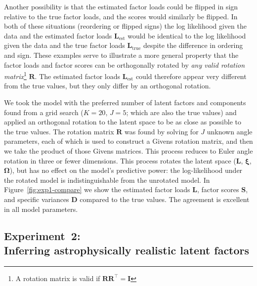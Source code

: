 \documentclass[twocolumn]{aastex62}
\newcommand{\vect}[1]{\boldsymbol{\mathbf{#1}}}
\renewcommand{\vec}[1]{\vect{#1}}
\newcommand{\transpose}{^\intercal}
\newcommand{\factorloads}{\textbf{L}}
\newcommand{\factorscores}{\textbf{S}}
\newcommand{\specificvariance}{\vec{D}}
\newcommand{\scoremeans}{\vec\xi}
\newcommand{\scorecovs}{\vec\Omega}
\newcommand{\NumLatentFactors}{J}
\newcommand{\NumComponents}{K}
\begin{document}
Another possibility is that the estimated factor loads could be flipped in sign 
relative to the true factor loads, and the scores would similarly be flipped. 
In both of these situations (reordering or flipped signs) the log likelihood 
given the data and the estimated factor loads $\factorloads_\textrm{est}$ 
would be identical to the log likelihood given the data and the true factor loads 
$\factorloads_\textrm{true}$
despite the difference in ordering and sign. These examples serve to illustrate a more 
general property that the factor loads and factor scores can be orthogonally 
rotated by \emph{any valid rotation matrix}\footnote{A rotation matrix is valid if 
$\vec{R}\vec{R}\transpose = \vec{I}$} $\vec{R}$. The estimated factor loads 
$\factorloads_\textrm{est}$ could therefore appear very different from the true 
values, but they only differ by an orthogonal rotation. 




We took the model with the preferred number of latent factors and components found
from a grid search ($\NumComponents = 20$, $\NumLatentFactors = 5$; which are also
the true values) and applied an orthogonal rotation to the latent space to be as
close as possible to the true values. The rotation matrix $\mathbf{R}$ was found
by solving for $\NumLatentFactors$ unknown angle parameters, each of which is used
to construct a Givens rotation matrix, and then we take the product of those Givens
matrices. This process reduces to Euler angle rotation in three or fewer dimensions.
This process rotates the latent space
($\factorloads$, $\scoremeans$, $\scorecovs$), but has no effect on the model's 
predictive power: the log-likelihood \citep[or the Kullback-Leibler divergence;][]{Kullback:1951} under the
rotated model is indistinguishable from the unrotated model.
In Figure~\ref{fig:exp1-compare} we show the estimated factor loads $\factorloads$,
factor scores $\factorscores$, and specific variances $\specificvariance$ compared
to the true values. The agreement is excellent in all model parameters. 

 


\subsection{Experiment~2:\\Inferring astrophysically realistic latent factors}
\end{document}
